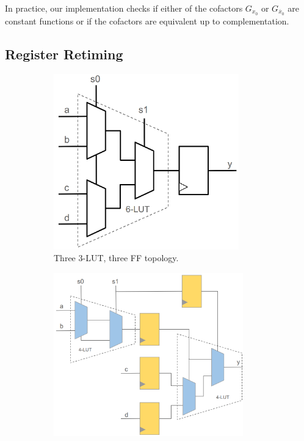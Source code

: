 In practice, our implementation checks if either of the cofactors $G_{x_0}$ or
$G_{\overline{x}_0}$ are constant functions or if the cofactors are equivalent
up to complementation.

\subsection{Register Retiming}\label{sec:rewrites:retiming}

\begin{figure}[tb]
    \begin{subfigure}{0.31\textwidth}
        \centering
        \includegraphics[width=0.88\textwidth]{img/mux_4_1.png}
        \caption{Three 3-LUT, three FF topology.}\label{fig:retiming:a}
    \end{subfigure}
    \begin{subfigure}{0.38\textwidth}
        \centering
        \includegraphics[width=0.9\textwidth]{img/mux_4_1_retime_dsd.png}

\end{subfigure}
\end{figure}
